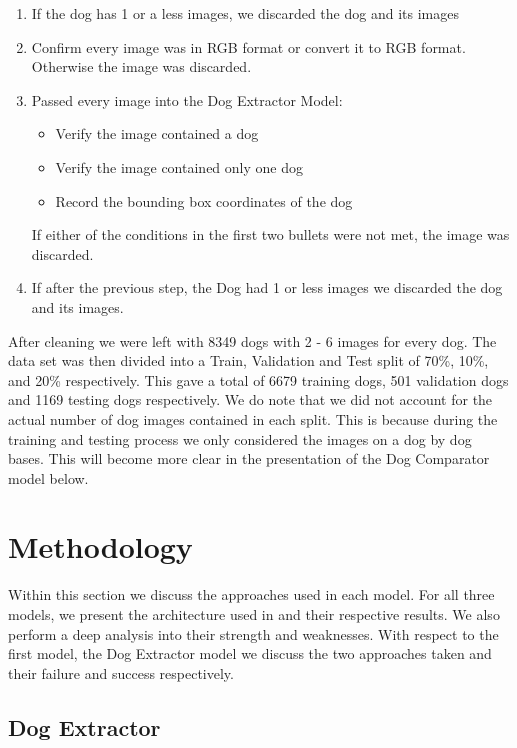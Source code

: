 \documentclass{article}
\begin{document}
\begin{enumerate}
  
  \item If the dog has 1 or a less images, we discarded the dog and its images
  
  \item Confirm every image was in RGB format or convert it to RGB format.  Otherwise the image was discarded.
  
  \item Passed every image into the Dog Extractor Model:
    \begin{itemize}
      \item Verify the image contained a dog
      \item Verify the image contained only one dog
      \item Record the bounding box coordinates of the dog
    \end{itemize}
    If either of the conditions in the first two bullets were not met, the image was discarded.
    
  \item If after the previous step, the Dog had 1 or less images we discarded the dog and its images.
  
\end{enumerate}

\noindent After cleaning we were left with 8349 dogs with 2 - 6 images for every dog.  The data set was then divided into a Train, Validation and Test split of 70\%, 10\%, and 20\% respectively.  This gave a total of 6679 training dogs, 501 validation dogs and 1169 testing dogs respectively.  We do note that we did not account for the actual number of dog images contained in each split.  This is because during the training and testing process we only considered the images on a dog by dog bases.  This will become more clear in the presentation of the Dog Comparator model below.

\section{Methodology}
Within this section we discuss the approaches used in each model.  For all three models, we present the architecture used in and their respective results.  We also perform a deep analysis into their strength and weaknesses.  With respect to the first model, the Dog Extractor model we discuss the two approaches taken and their failure and success respectively.

\subsection{Dog Extractor}
\end{document}

